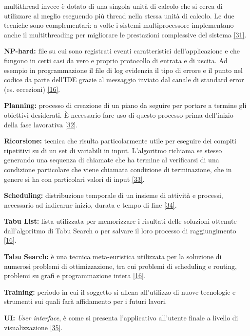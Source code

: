 \begin{description}
     multithread invece è dotato di una singola unità di calcolo che si cerca di utilizzare al meglio eseguendo più thread nella stessa unità di calcolo. Le due tecniche sono complementari: a volte i sistemi
     multiprocessore implementano anche il multithreading per migliorare le prestazioni complessive del sistema \hyperref[multithread]{[31]}.
    \item \label{Np-hard} \textbf{NP-hard:} file su cui sono registrati eventi caratteristici dell’applicazione e che fungono
    in certi casi da vero e proprio protocollo di entrata e di uscita. Ad esempio in
    programmazione il file di log evidenzia il tipo di errore e il punto nel codice
    da parte dell’IDE grazie al messaggio inviato dal canale di standard error (es.
    eccezioni) \hyperref[slide]{[16]}.
    \item \label{Planning} \textbf{Planning:} processo di creazione di un piano da seguire per portare a termine gli obiettivi desiderati. È necessario fare uso di questo processo prima 
    dell'inizio della fase lavorativa \hyperref[planning]{[32]}.
    \item \label{Ricorsione} \textbf{Ricorsione:} tecnica che risulta particolarmente utile per eseguire dei compiti ripetitivi su di un set di variabili in input.
    L'algoritmo richiama se stesso generando una sequenza di chiamate che ha termine al verificarsi di una condizione particolare che viene chiamata condizione di terminazione, che in genere si ha con particolari
    valori di input \hyperref[ricorsione]{[33]}.
    \item \label{Scheduling} \textbf{Scheduling:} distribuzione temporale di un insieme di attività e processi, necessario ad indicarne inizio, durata e tempo di fine \hyperref[scheduling2]{[34]}. 
    \item \label{Tabu List} \textbf{Tabu List:} lista utilizzata per memorizzare i risultati delle soluzioni ottenute dall'algoritmo di Tabu Search o per salvare il loro processo di raggiungimento \hyperref[slide]{[16]}.
    \item \label{Tabu Search} \textbf{Tabu Search:} è una tecnica meta-euristica utilizzata per la soluzione di numerosi problemi di ottimizzazione, tra cui problemi di scheduling e routing, 
    problemi su grafi e programmazione intera \hyperref[slide]{[16]}.
    \item \label{Training} \textbf{Training:} periodo in cui il soggetto si allena all'utilizzo di nuove tecnologie e strumenti sui quali farà affidamento per i futuri lavori.
    \item \label{UI} \textbf{UI:} \textit{User interface}, è come si presenta l'applicativo all'utente finale a livello di visualizzazione \hyperref[UI]{[35]}. 
    
\end{description}
